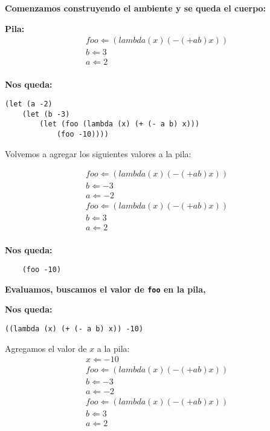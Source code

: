 \textbf{Comenzamos construyendo el ambiente y se queda el cuerpo:}

\vspace{.3cm}

\textbf{Pila:}
\[
\begin{array}{c}
  foo \Leftarrow (lambda (x) (- (+ a b) x))\\
  b \Leftarrow 3 \\
  a \Leftarrow 2 \\
\end{array}
\]

\textbf{Nos queda:}
\begin{verbatim}
(let (a -2)
    (let (b -3)
        (let (foo (lambda (x) (+ (- a b) x)))
            (foo -10))))
\end{verbatim}

Volvemos a agregar los siguientes valores a la pila:

\vspace{.3cm}
\[
\begin{array}{c}
  foo \Leftarrow (lambda (x) (- (+ a b) x))\\
  b \Leftarrow -3 \\
  a \Leftarrow -2 \\
  foo \Leftarrow (lambda (x) (- (+ a b) x))\\
  b \Leftarrow 3 \\
  a \Leftarrow 2 \\
\end{array}
\]

\textbf{Nos queda:}
\begin{verbatim}
    (foo -10)
\end{verbatim}

\textbf{Evaluamos, buscamos el valor de \texttt{foo} en la pila,}

\vspace{.3cm}

\textbf{Nos queda:}
\begin{verbatim}
((lambda (x) (+ (- a b) x)) -10)
\end{verbatim}

Agregamos el valor de $x$ a la pila:
\[
\begin{array}{c}
  x \Leftarrow -10\\
  foo \Leftarrow (lambda (x) (- (+ a b) x))\\
  b \Leftarrow -3 \\
  a \Leftarrow -2 \\
  foo \Leftarrow (lambda (x) (- (+ a b) x))\\
  b \Leftarrow 3 \\
  a \Leftarrow 2 \\
\end{array}
\]

